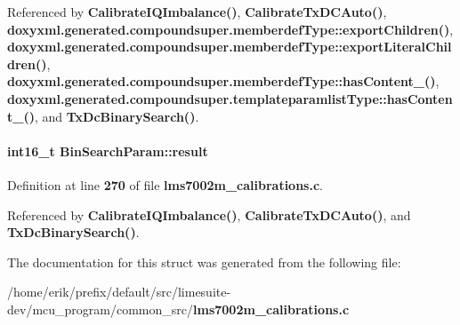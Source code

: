 Referenced by {\bf Calibrate\+I\+Q\+Imbalance()}, {\bf Calibrate\+Tx\+D\+C\+Auto()}, {\bf doxyxml.\+generated.\+compoundsuper.\+memberdef\+Type\+::export\+Children()}, {\bf doxyxml.\+generated.\+compoundsuper.\+memberdef\+Type\+::export\+Literal\+Children()}, {\bf doxyxml.\+generated.\+compoundsuper.\+memberdef\+Type\+::has\+Content\+\_\+()}, {\bf doxyxml.\+generated.\+compoundsuper.\+templateparamlist\+Type\+::has\+Content\+\_\+()}, and {\bf Tx\+Dc\+Binary\+Search()}.

\paragraph[{result}]{\setlength{\rightskip}{0pt plus 5cm}int16\+\_\+t Bin\+Search\+Param\+::result}\label{structBinSearchParam_a9ba03b2c25c9b82775dec54a382c0441}


Definition at line {\bf 270} of file {\bf lms7002m\+\_\+calibrations.\+c}.



Referenced by {\bf Calibrate\+I\+Q\+Imbalance()}, {\bf Calibrate\+Tx\+D\+C\+Auto()}, and {\bf Tx\+Dc\+Binary\+Search()}.



The documentation for this struct was generated from the following file\+:\begin{DoxyCompactItemize}
\item 
/home/erik/prefix/default/src/limesuite-\/dev/mcu\+\_\+program/common\+\_\+src/{\bf lms7002m\+\_\+calibrations.\+c}\end{DoxyCompactItemize}
